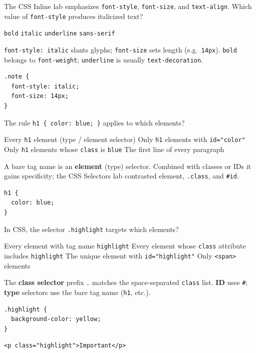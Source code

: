\question[4]
The CSS Inline lab emphasizes \texttt{font-style}, \texttt{font-size}, and \texttt{text-align}. Which value of \texttt{font-style} produces italicized text?
\begin{choices}
  \choice \texttt{bold}
  \CorrectChoice \texttt{italic}
  \choice \texttt{underline}
  \choice \texttt{sans-serif}
\end{choices}
\begin{solution}
  \texttt{font-style: italic} slants glyphs; \texttt{font-size} sets length (e.g.\ \texttt{14px}). \texttt{bold} belongs to \texttt{font-weight}; \texttt{underline} is usually \texttt{text-decoration}.
\begin{lstlisting}[style=cssinline]
.note {
  font-style: italic;
  font-size: 14px;
}
\end{lstlisting}
\end{solution}

\question[4]
The rule \texttt{h1 \{ color: blue; \}} applies to which elements?
\begin{choices}
  \CorrectChoice Every \texttt{h1} element (type / element selector)
  \choice Only \texttt{h1} elements with \texttt{id="color"}
  \choice Only \texttt{h1} elements whose \texttt{class} is \texttt{blue}
  \choice The first line of every paragraph
\end{choices}
\begin{solution}
  A bare tag name is an \textbf{element} (type) selector. Combined with classes or IDs it gains specificity; the CSS Selectors lab contrasted element, \texttt{.class}, and \texttt{\#id}.
\begin{lstlisting}[style=cssinline]
h1 {
  color: blue;
}
\end{lstlisting}
\end{solution}

\newpage


\question[4]
In CSS, the selector \texttt{.highlight} targets which elements?
\begin{choices}
  \choice Every element with tag name \texttt{highlight}
  \CorrectChoice Every element whose \texttt{class} attribute includes \texttt{highlight}
  \choice The unique element with \texttt{id="highlight"}
  \choice Only \texttt{<span>} elements
\end{choices}
\begin{solution}
  The \textbf{class selector} prefix \texttt{.} matches the space-separated \texttt{class} list. \textbf{ID} uses \texttt{\#}; \textbf{type} selectors use the bare tag name (\texttt{h1}, etc.).
\begin{lstlisting}[style=cssinline]
.highlight {
  background-color: yellow;
}
\end{lstlisting}
\begin{lstlisting}[style=htmlinline]
<p class="highlight">Important</p>
\end{lstlisting}
\end{solution}

